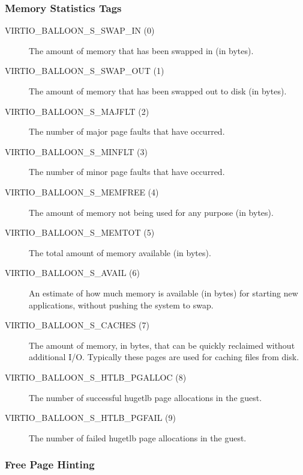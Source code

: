 \subsubsection{Memory Statistics Tags}\label{sec:Device Types / Memory Balloon Device / Device Operation / Memory Statistics Tags}

\begin{description}
\item[VIRTIO_BALLOON_S_SWAP_IN (0)] The amount of memory that has been
  swapped in (in bytes).

\item[VIRTIO_BALLOON_S_SWAP_OUT (1)] The amount of memory that has been
  swapped out to disk (in bytes).

\item[VIRTIO_BALLOON_S_MAJFLT (2)] The number of major page faults that
  have occurred.

\item[VIRTIO_BALLOON_S_MINFLT (3)] The number of minor page faults that
  have occurred.

\item[VIRTIO_BALLOON_S_MEMFREE (4)] The amount of memory not being used
  for any purpose (in bytes).

\item[VIRTIO_BALLOON_S_MEMTOT (5)] The total amount of memory available
  (in bytes).

\item[VIRTIO_BALLOON_S_AVAIL (6)] An estimate of how much memory is available
  (in bytes) for starting new applications, without pushing the system to swap.

\item[VIRTIO_BALLOON_S_CACHES (7)] The amount of memory, in bytes, that can be
  quickly reclaimed without additional I/O. Typically these pages are used for
  caching files from disk.

\item[VIRTIO_BALLOON_S_HTLB_PGALLOC (8)] The number of successful hugetlb page
  allocations in the guest.

\item[VIRTIO_BALLOON_S_HTLB_PGFAIL (9)] The number of failed hugetlb page
  allocations in the guest.
\end{description}

\subsubsection{Free Page Hinting}\label{sec:Device Types / Memory Balloon Device / Device Operation / Free Page Hinting}

